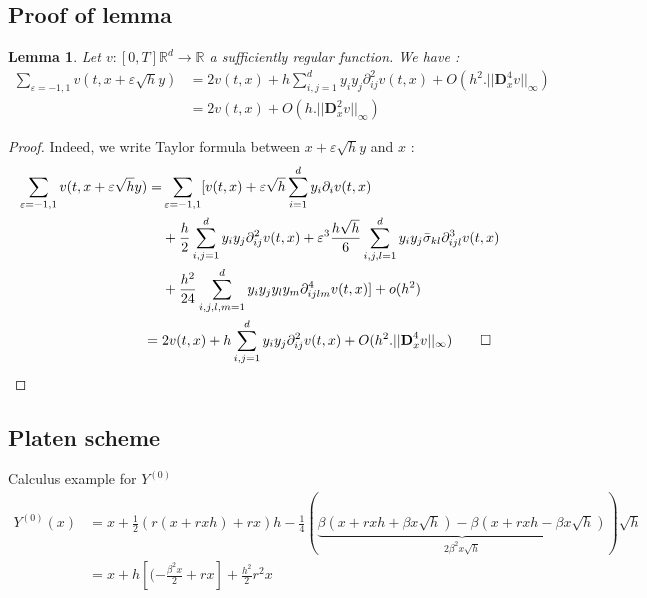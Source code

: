 \documentclass[a4paper,10pt]{article}
\newtheorem*{lemma*}{Lemma}
\begin{document}
\subsection{Proof of lemma}
\begin{lemma*}
Let $v:[0,T]\mathbb{R}^d \longrightarrow \mathbb{R} $ a sufficiently regular function. We have :
\begin{align*}
\sum_{\varepsilon={-1,1}}v(t,x+\varepsilon\sqrt{h}y)
& = 2v(t,x) + h\sum_{i,j=1}^d y_{i}y_{j}\partial^2_{ij}v(t,x) + O(h^2.||\textbf{D}^4_xv||_\infty)\\
& = 2v(t,x) +  O(h.||\textbf{D}^2_xv||_\infty)
\end{align*}
\end{lemma*}
\begin{proof}
Indeed, we write Taylor formula between $x + \varepsilon\sqrt{h}y$ and $x$ : 
\begin{align*}
\sum_{\varepsilon={-1,1}}v(t,x + \varepsilon\sqrt{h}y) 
=&\sum_{\varepsilon={-1,1}} [ v(t,x) + \varepsilon \sqrt{h} \sum_{i=1}^d  y_{i}\partial_i v(t,x) \\
 &+\frac{h}{2} \sum_{i,j=1}^d y_{i}y_{j}\partial^2_{ij}v(t,x) 
  +\varepsilon^3 \frac{h\sqrt{h}}{6} \sum_{i,j,l=1}^d y_{i}y_{j}\bar{\sigma}_{kl}\partial^3_{ijl}v(t,x) \\
 &+\frac{h^2}{24}\sum_{i,j,l,m=1}^d y_{i}y_{j}y_{l}y_{m}\partial^4_{ijlm}v(t,x)] 
  + o(h^2)\\
 =\hspace{0.1cm}& 2v(t,x) + h\sum_{i,j=1}^d y_{i}y_{j}\partial^2_{ij}v(t,x) + O(h^2.||\textbf{D}^4_xv||_\infty) \qed
\end{align*}
\end{proof}
\subsection{Platen scheme} \label{Platen calculus}
Calculus example for $Y^{(0)}$
\begin{equation}
\begin{split}
Y^{(0)}(x) &=x+\frac{1}{2}(r(x+rxh)+rx)h  
		-\frac{1}{4}(\underbrace{\beta(x+rxh+\beta x \sqrt{h})-\beta(x+rxh-\beta x \sqrt{h})}_{2\beta^2 x \sqrt{h}})\sqrt{h}\\
		&=x+h[(-\frac{\beta^2 x}{2}  +rx ] +\frac{h^2}{2}r^2x
\end{split}
\end{equation}




\end{document}
